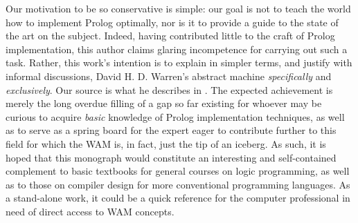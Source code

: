Our motivation to be so conservative is simple: our goal is not to teach the
world how to implement Prolog optimally, nor is it to provide a guide to the
state of the art on the subject. Indeed, having contributed little to the craft
of Prolog implementation, this author claims glaring incompetence for carrying
out such a task. Rather, this work’s intention is to explain in simpler terms,
and justify with informal discussions, David H. D. Warren’s abstract machine
\emph{specifically} and \emph{exclusively}. Our source is what he describes in
\cite{War83, War88}. The expected achievement is merely the long overdue filling
of a gap so far existing for whoever may be curious to acquire \emph{basic}
knowledge of Prolog implementation techniques, as well as to serve as a spring
board for the expert eager to contribute further to this field for which the WAM
is, in fact, just the tip of an iceberg. As such, it is hoped that this
monograph would constitute an interesting and self-contained complement to basic
textbooks for general courses on logic programming, as well as to those on
compiler design for more conventional programming languages. As a stand-alone
work, it could be a quick reference for the computer professional in need of
direct access to WAM concepts.


\secup
\secup